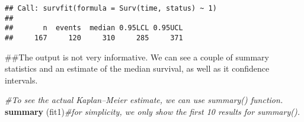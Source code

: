 \documentclass[]{book}
\newenvironment{Shaded}{\begin{snugshade}}{\end{snugshade}}
\newcommand{\KeywordTok}[1]{\textcolor[rgb]{0.13,0.29,0.53}{\textbf{#1}}}
\newcommand{\CommentTok}[1]{\textcolor[rgb]{0.56,0.35,0.01}{\textit{#1}}}
\newcommand{\NormalTok}[1]{#1}
\theoremstyle{definition}
\theoremstyle{definition}
\theoremstyle{definition}
\theoremstyle{remark}
\begin{document}
\begin{verbatim}
## Call: survfit(formula = Surv(time, status) ~ 1)
## 
##       n  events  median 0.95LCL 0.95UCL 
##     167     120     310     285     371
\end{verbatim}

\begin{Shaded}
\begin{Highlighting}[]
\NormalTok{##The output is not very informative. We can see a couple of summary statistics and an estimate of the median survival, as well as it confidence intervals.}

\CommentTok{#To see the actual Kaplan–Meier estimate, we can use summary() function. }
\KeywordTok{summary}\NormalTok{ (fit1)}\CommentTok{#for simplicity, we only show the first 10 results for summary().}
\end{Highlighting}
\end{Shaded}
\end{document}

